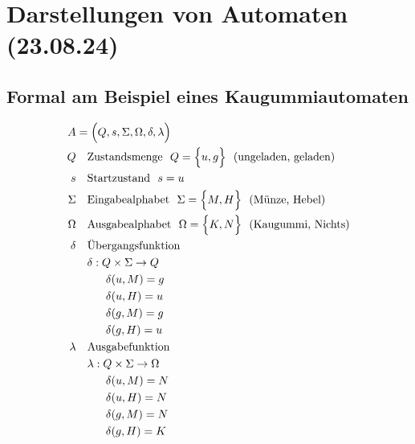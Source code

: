\documentclass[12pt,a4paper]{report}
\begin{document}
	\section{Darstellungen von Automaten (23.08.24)}
	\subsection{Formal am Beispiel eines Kaugummiautomaten}
	\begin{align*}
		A &= \Bigl(Q, s, \Sigma, \Omega, \delta, \lambda\Bigl) \\
		Q & \ \ \ \text{Zustandsmenge}\ \ Q = \Bigl\{u, g\Bigl\}\ \ (\text{ungeladen, geladen})\\
		s & \ \ \ \text{Startzustand}\ \ s = u\\
		\Sigma &\ \ \ \text{Eingabealphabet}\ \ \Sigma = \Bigl\{M, H\Bigl\}\ \ (\text{Münze, Hebel})\\
		\Omega & \ \ \ \text{Ausgabealphabet}\ \ \Omega = \Bigl\{K, N\Bigl\}\ \ (\text{Kaugummi, Nichts})\\
		\delta &\ \ \ \text{Übergangsfunktion} \\
		&\ \ \ \delta: Q \times \Sigma \to Q\\
		&\ \ \ \ \ \ \ \ \delta(u,M) = g\\
		&\ \ \ \ \ \ \ \ \delta(u,H) = u\\
		&\ \ \ \ \ \ \ \ \delta(g,M) = g\\
		&\ \ \ \ \ \ \ \ \delta(g,H) = u\\
		\lambda &\ \ \ \text{Ausgabefunktion} \\
		&\ \ \ \lambda: Q \times \Sigma \to \Omega\\
		&\ \ \ \ \ \ \ \ \delta(u,M) = N\\
		&\ \ \ \ \ \ \ \ \delta(u,H) = N\\
		&\ \ \ \ \ \ \ \ \delta(g,M) = N\\
		&\ \ \ \ \ \ \ \ \delta(g,H) = K\\
	\end{align*}
	\subsection{}
\end{document}
